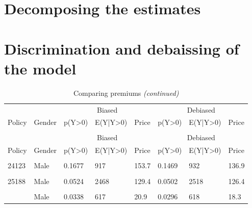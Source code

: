\documentclass[
]{article}
\begin{document}
\newpage

\hypertarget{decomposing-the-estimates}{%
\section{Decomposing the estimates}\label{decomposing-the-estimates}}

\newpage

\hypertarget{discrimination-and-debaissing-of-the-model}{%
\section{Discrimination and debaissing of the
model}\label{discrimination-and-debaissing-of-the-model}}

\begin{longtable}[t]{llllllll}
\caption{\label{tab:unnamed-chunk-11}Comparing premiums}\\
\toprule
\multicolumn{2}{c}{ } & \multicolumn{3}{c}{Biased} & \multicolumn{3}{c}{Debiased} \\
\cmidrule(l{3pt}r{3pt}){3-5} \cmidrule(l{3pt}r{3pt}){6-8}
Policy & Gender & p(Y>0) & E(Y|Y>0) & Price & p(Y>0) & E(Y|Y>0) & Price\\
\midrule
\endfirsthead
\caption[]{Comparing premiums \textit{(continued)}}\\
\toprule
\multicolumn{2}{c}{ } & \multicolumn{3}{c}{Biased} & \multicolumn{3}{c}{Debiased} \\
\cmidrule(l{3pt}r{3pt}){3-5} \cmidrule(l{3pt}r{3pt}){6-8}
Policy & Gender & p(Y>0) & E(Y|Y>0) & Price & p(Y>0) & E(Y|Y>0) & Price\\
\midrule
\endhead

\endfoot
\bottomrule
\endlastfoot
\cellcolor{gray!6}{6254} & \cellcolor{gray!6}{Female} & \cellcolor{gray!6}{0.0465} & \cellcolor{gray!6}{1051} & \cellcolor{gray!6}{48.9} & \cellcolor{gray!6}{0.0550} & \cellcolor{gray!6}{1007} & \cellcolor{gray!6}{55.4}\\
24123 & Male & 0.1677 & 917 & 153.7 & 0.1469 & 932 & 136.9\\
\cellcolor{gray!6}{25010} & \cellcolor{gray!6}{Female} & \cellcolor{gray!6}{0.1097} & \cellcolor{gray!6}{1226} & \cellcolor{gray!6}{134.4} & \cellcolor{gray!6}{0.1074} & \cellcolor{gray!6}{1189} & \cellcolor{gray!6}{127.7}\\
25188 & Male & 0.0524 & 2468 & 129.4 & 0.0502 & 2518 & 126.4\\
\cellcolor{gray!6}{30495} & \cellcolor{gray!6}{Female} & \cellcolor{gray!6}{0.1034} & \cellcolor{gray!6}{755} & \cellcolor{gray!6}{78.1} & \cellcolor{gray!6}{0.0976} & \cellcolor{gray!6}{804} & \cellcolor{gray!6}{78.4}\\
\addlinespace
30555 & Male & 0.0338 & 617 & 20.9 & 0.0296 & 618 & 18.3\\*
\end{longtable}
\end{document}
